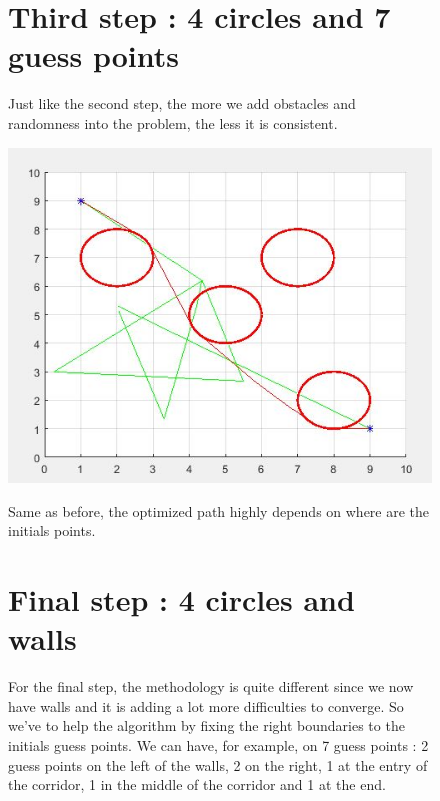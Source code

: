 \begin{figure}
\vspace{-10mm}

\section{Third step : 4 circles and 7 guess points}
Just like the second step, the more we add obstacles and randomness into the problem, the less it is consistent.

\begin{center}
\includegraphics[width=1\textwidth]{level3.JPG}
\end{center}

Same as before, the optimized path highly depends on where are the initials points.
\vspace{5mm}
\section{Final step : 4 circles and walls}
For the final step, the methodology is quite different since we now have walls and it is adding a lot more difficulties to converge. So we've to help the algorithm by fixing the right boundaries to the initials guess points. We can have, for example, on  7 guess points : 2 guess points on the left of the walls, 2 on the right, 1 at the entry of the corridor, 1 in the middle of the corridor and 1 at the end.
\end{figure}
